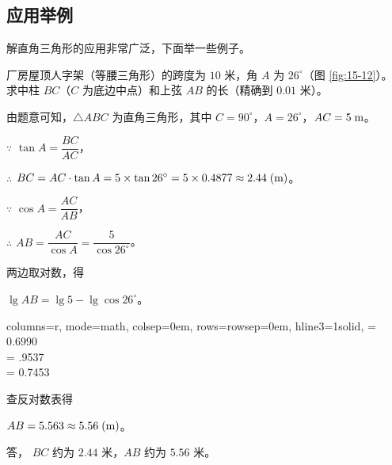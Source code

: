 \subsection{应用举例}\label{subsec:15-6}
\begin{enhancedline}

解直角三角形的应用非常广泛，下面举一些例子。

\liti 厂房屋顶人字架（等腰三角形）的跨度为 $10$ 米，角 $A$ 为 $26^\circ$（图 \ref{fig:15-12}）。
求中柱 $BC$（$C$ 为底边中点）和上弦 $AB$ 的长（精确到 $0.01$ 米）。

\jie 由题意可知，$\triangle ABC$ 为直角三角形，其中 $C = 90^\circ$，$A = 26^\circ$，$AC = 5 \; \mathord{\text{m}}$。

$\because$   \quad $\tan A = \dfrac{BC}{AC}$，

$\therefore$ \quad $BC = AC \cdot \tan A = 5 \times \tan 26^\circ = 5 \times 0.4877 \approx 2.44 \; (\mathord{\text{m}})$。

$\because$   \quad $\cos A = \dfrac{AC}{AB}$，

$\therefore$ \quad $AB = \dfrac{AC}{\cos A} = \dfrac{5}{\cos 26^\circ}$。

两边取对数，得

\hspace*{2em} $\lg{AB} = \lg{5} - \lg{\cos 26^\circ}$。

\hspace*{2em} \begin{tblr}[t]{
    columns={r, mode=math, colsep=0em},
    rows={rowsep=0em},
    hline{3}={1}{solid},
}
     = 0.6990 \\
     = .9537  \\
     = 0.7453
\end{tblr}

查反对数表得

\hspace*{2em} $AB = 5.563 \approx 5.56 \; (\mathord{\text{m}})$。

答， $BC$ 约为 $2.44$ 米，$AB$ 约为 $5.56$ 米。


\begin{figure}[htbp]
    \centering
    \begin{minipage}[b]{6.5cm}
        \centering
        
        \caption{}\label{fig:15-12}
    \end{minipage}
    \qquad
    \begin{minipage}[b]{8cm}
        \centering
        
        \caption{}\label{fig:15-13}
    \end{minipage}
\end{figure}



\end{enhancedline}
